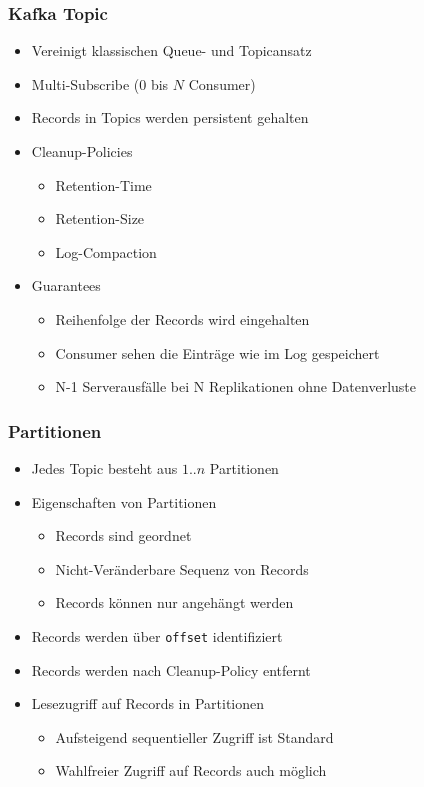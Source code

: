 \begin{frame}
\frametitle{Kafka Topic}
\begin{itemize}
	\item Vereinigt klassischen Queue- und Topicansatz
	\item Multi-Subscribe ($0$ bis $N$ Consumer)		%
	\item Records in Topics werden persistent gehalten
	\item Cleanup-Policies
		\begin{itemize}
			\item Retention-Time
			\item Retention-Size
			\item Log-Compaction
		\end{itemize}
	\item Guarantees
		\begin{itemize}
			\item Reihenfolge der Records wird eingehalten
			\item Consumer sehen die Einträge wie im Log gespeichert
			\item N-1 Serverausfälle bei N Replikationen ohne Datenverluste
		\end{itemize}
\end{itemize}
\end{frame}

\begin{frame}
\frametitle{Partitionen}
\begin{itemize}
	\item Jedes Topic besteht aus $1..n$ Partitionen
	\item Eigenschaften von Partitionen
	\begin{itemize}
		\item Records sind geordnet
		\item Nicht-Veränderbare Sequenz von Records
		\item Records können nur angehängt werden
	\end{itemize}
	\item Records werden über \texttt{offset} identifiziert
	\item Records werden nach Cleanup-Policy entfernt
	\item Lesezugriff auf Records in Partitionen
	\begin{itemize}
		\item Aufsteigend sequentieller Zugriff ist Standard
		\item Wahlfreier Zugriff auf Records auch möglich
	\end{itemize}
\end{itemize}
\end{frame}

